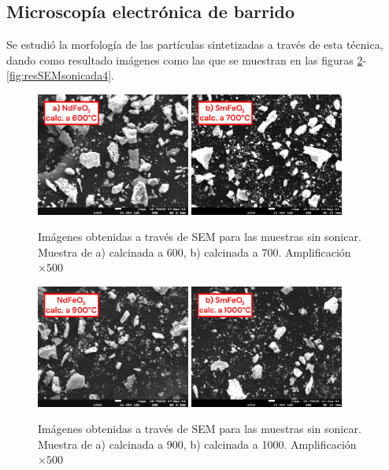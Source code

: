\documentclass[../main.tex]{subfiles}
\begin{document}
\subsection{Microscopía electrónica de barrido}
Se estudió la morfología de las partículas sintetizadas a través de esta técnica, dando como resultado imágenes como las que se muestran en las figuras \ref{fig:resSEM900}-\ref{fig:resSEMsonicada4}.
\begin{figure}[H]
    \centering
    \includegraphics[width=0.45\textwidth]{fig/semneod600.png}
    \quad
    \includegraphics[width=0.45\textwidth]{fig/semsama700.png}
    \caption{Imágenes obtenidas a través de SEM para las muestras sin sonicar. Muestra de a) \neod{} calcinada a 600\gradoC{}, b) \sama{} calcinada a 700\gradoC{}. Amplificación $\times500$}
    \label{fig:resSEMsinsonicar}
\end{figure}
\begin{figure}[H]
    \centering
    \includegraphics[width=0.45\textwidth]{fig/semneod900.png}
    \quad
    \includegraphics[width=0.45\textwidth]{fig/semsama1000.png}
    \caption{Imágenes obtenidas a través de SEM para las muestras sin sonicar. Muestra de a) \neod{} calcinada a 900\gradoC{}, b) \sama{} calcinada a 1000\gradoC{}. Amplificación $\times500$}
    \label{fig:resSEM900}
\end{figure}
\end{document}
